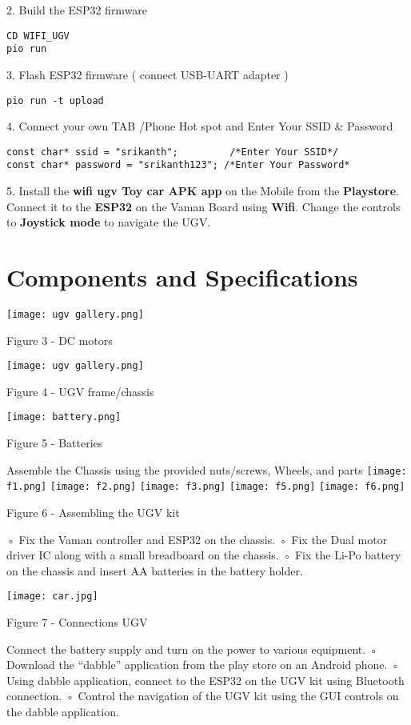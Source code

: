 \documentclass[journal,15pt,twocolumn,tikz, border=5mm]{IEEEtran}
\begin{document}
2. Build the ESP32 firmware
\begin{lstlisting}
CD WIFI_UGV
pio run
\end{lstlisting} 

3. Flash ESP32 firmware ( connect USB-UART adapter )
\begin{lstlisting}
pio run -t upload
\end{lstlisting} 

4. Connect your own TAB /Phone Hot spot and  Enter Your SSID &  Password
\begin{lstlisting}
const char* ssid = "srikanth";         /*Enter Your SSID*/ 
const char* password = "srikanth123"; /*Enter Your Password*
\end{lstlisting} 
5. Install the \textbf{wifi ugv Toy car APK app} on the Mobile from the \textbf{Playstore}. Connect it to the \textbf{ESP32} on the Vaman Board using \textbf{Wifi}. Change the controls to \textbf{Joystick mode} to navigate the UGV.\\

\section{Components and Specifications}
\texttt{[image: ugv gallery.png]}
\centerline{Figure 3 - DC motors}

\texttt{[image: ugv gallery.png]}
\centerline{Figure 4 - UGV frame/chassis}

\texttt{[image: battery.png]}
\centerline{Figure 5 - Batteries}
Assemble the Chassis using the provided nuts/screws, Wheels, and parts
\texttt{[image: f1.png]}
\texttt{[image: f2.png]}
\texttt{[image: f3.png]}
\texttt{[image: f5.png]}
\texttt{[image: f6.png]}
\centerline{Figure 6 - Assembling the UGV kit}
◦ Fix the Vaman controller and ESP32 on the chassis.
◦ Fix the Dual motor driver IC along with a small breadboard on the chassis.
◦ Fix the Li-Po battery on the chassis and insert AA batteries in the battery holder.

\texttt{[image: car.jpg]}
\centerline{Figure 7 -  Connections UGV }
Connect the battery supply and turn on the power to various equipment.
◦ Download the “dabble” application from the play store on an Android phone.
◦ Using dabble application, connect to the ESP32 on the UGV kit using Bluetooth connection.
◦ Control the navigation of the UGV kit using the GUI controls on the dabble application.
\end{document}

